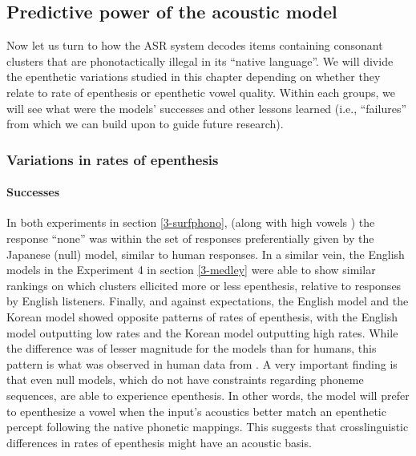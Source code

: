 {%
\subsection{Predictive power of the acoustic model}
Now let us turn to how the ASR system decodes items containing consonant clusters that are phonotactically illegal in its ``native language''. We will divide the epenthetic variations studied in this chapter depending on whether they relate to rate of epenthesis or epenthetic vowel quality. Within each groups, we will see what were the models' successes and other lessons learned (i.e., ``failures'' from which we can build upon to guide future research).   

\subsubsection{Variations in rates of epenthesis}
\paragraph{Successes}
In both experiments in section \ref{3-surfphono}, (along with high vowels ) the response ``none'' was within the set of responses preferentially given by the Japanese (null) model, similar to human responses. In a similar vein, the English models in the Experiment 4 in section \ref{3-medley} were able to show similar rankings on which clusters ellicited more or less epenthesis, relative to responses by English listeners. Finally, and against expectations, the English model and the Korean model showed opposite patterns of rates of epenthesis, with the English model outputting low rates and the Korean model outputting high rates. While the difference was of lesser magnitude for the models than for humans, this pattern is what was observed in human data from \cite{durvasula2015}. A very important finding is that even null models, which do not have constraints regarding phoneme sequences, are able to experience epenthesis. In other words, the model will prefer to epenthesize a vowel when the input's acoustics better match an epenthetic percept following the native phonetic mappings. This suggests that crosslinguistic differences in rates of epenthesis might have an acoustic basis.      

}
